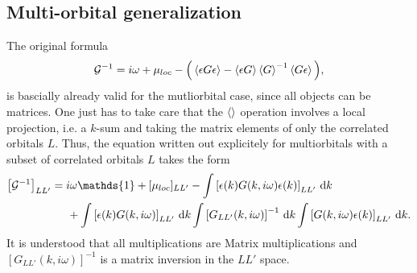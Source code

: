 \documentclass[12pt,a4paper]{scrartcl}
\numberwithin{equation}{section}
\newcommand{\unity}{\mathds{1}}
\begin{document}
\subsection{Multi-orbital generalization}
The original formula 
\begin{align}
 \mathcal{G}^{-1} 
 = i\omega + \mu_{loc} - \Big( \braket{ \epsilon G \epsilon } - \braket{\epsilon G} \braket{G}^{-1}  \braket{ G \epsilon }  \Big) ,
 \end{align}
 is bascially already valid for the mutliorbital case, since all objects can be matrices.
 One just has to take care that the $\braket{}$ operation involves a local projection, i.e.
 a $k$-sum and taking the matrix elements of only the correlated orbitals $L$.
 Thus, the equation written out explicitely for multiorbitals with a subset of correlated
 orbitals $L$ takes the form
\begin{align}
 \left[ \mathcal{G}^{-1} \right]_{LL'}
 &= i\omega\unity + [\mu_{loc}]_{LL'} 
 -  \int \left [ \epsilon(k) G(k,i\omega) \epsilon(k) \right]_{LL'} \, \mathrm{d}k \nonumber \\
 & \hspace{0.5cm }+ \int \left[ \epsilon(k) G(k,i\omega) \right]_{LL'}  \, \mathrm{d}k 
                  \int \left[ G_{LL'}(k,i\omega) \right]^{-1}   \, \mathrm{d}k
                  \int  \left[ G(k,i\omega) \epsilon(k) \right]_{LL'} \, \mathrm{d}k  .
 \end{align} 
 It is understood that all multiplications are Matrix multiplications 
 and $\left[ G_{LL'}(k,i\omega) \right]^{-1}$ is a matrix inversion in the $LL'$ space.

 
 
 
\end{document}
